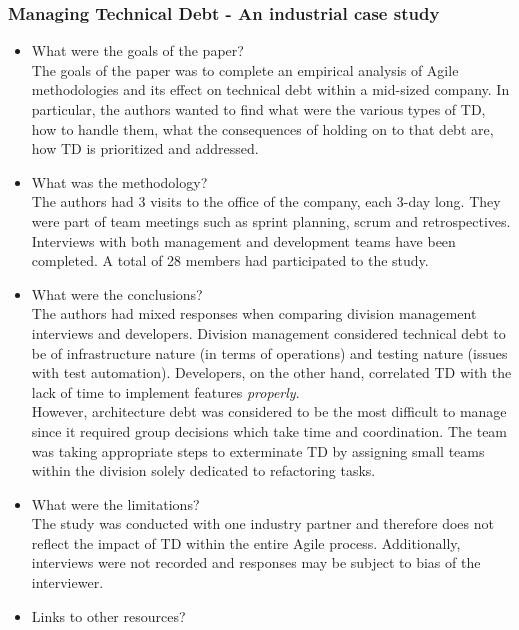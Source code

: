 \documentclass{mprop}
\begin{document}
\subsubsection{Managing Technical Debt - An industrial case study} \cite{Codabux2013}
\begin{itemize}
	\item What were the goals of the paper? \\
	      The goals of the paper was to complete an empirical analysis of Agile methodologies and its effect on technical debt within a mid-sized company.
	      In particular, the authors wanted to find what were the various types of TD, how to handle them, what the consequences of holding on to that debt are, how TD is prioritized and addressed.
	\item What was the methodology? \\
	      The authors had 3 visits to the office of the company, each 3-day long.
	      They were part of team meetings such as sprint planning, scrum and retrospectives.
	      Interviews with both management and development teams have been completed.
	      A total of 28 members had participated to the study.
	\item What were the conclusions? \\
	      The authors had mixed responses when comparing division management interviews and developers.
	      Division management considered technical debt to be of infrastructure nature (in terms of operations) and testing nature (issues with test automation).
	      Developers, on the other hand, correlated TD with the lack of time to implement features \textit{properly}.\\
	      However, architecture debt was considered to be the most difficult to manage since it required group decisions which take time and coordination.
	      The team was taking appropriate steps to exterminate TD by assigning small teams within the division solely dedicated to refactoring tasks.
	\item What were the limitations? \\
	      The study was conducted with one industry partner and therefore does not reflect the impact of TD within the entire Agile process.
	      Additionally, interviews were not recorded and responses may be subject to bias of the interviewer.
	\item Links to other resources? \\
\end{itemize}
\end{document}
